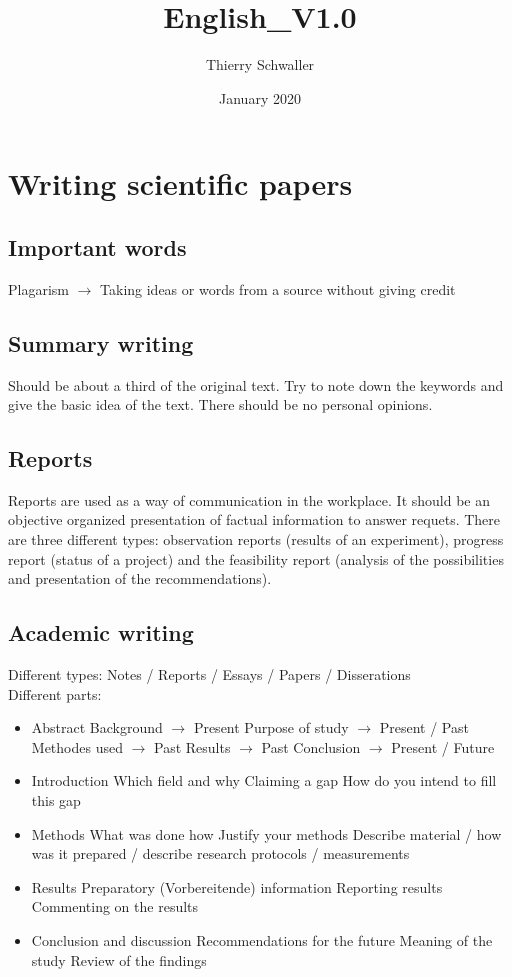 \documentclass{article}
\title{English_V1.0}
\author{Thierry Schwaller}
\date{January 2020}
\begin{document}
\section{Writing scientific papers}
\subsection{Important words}
Plagarism $\rightarrow$ Taking ideas or words from a source without giving credit
\subsection{Summary writing}
Should be about a third of the original text. Try to note down the keywords and give the basic idea of the text. There should be no personal opinions.
\subsection{Reports}
Reports are used as a way of communication in the workplace. It should be an objective organized presentation of factual information to answer requets. There are three different types: observation reports (results of an experiment), progress report (status of a project) and the feasibility report (analysis of the possibilities and presentation of the recommendations).
\subsection{Academic writing}
Different types: Notes / Reports / Essays / Papers / Disserations \\
Different parts: 
\begin{itemize}
    \item Abstract
    \subitem Background $\rightarrow$ Present
    \subitem Purpose of study $\rightarrow$ Present / Past
    \subitem Methodes used $\rightarrow$ Past
    \subitem Results $\rightarrow$ Past
    \subitem Conclusion $\rightarrow$ Present / Future
    \item Introduction
    \subitem Which field and why
    \subitem Claiming a gap
    \subitem How do you intend to fill this gap
    \item Methods
    \subitem What was done how
    \subitem Justify your methods
    \subitem Describe material / how was it prepared / describe research protocols / measurements
    \item Results
    \subitem Preparatory (Vorbereitende) information
    \subitem Reporting results
    \subitem Commenting on the results
    \item Conclusion and discussion
    \subitem Recommendations for the future
    \subitem Meaning of the study
    \subitem Review of the findings
\end{itemize}
\newpage
\end{document}
